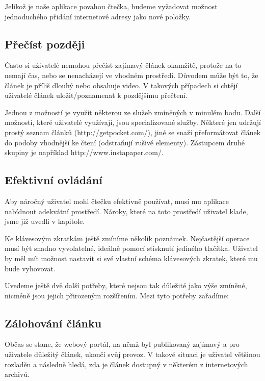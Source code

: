 Jelikož je naše aplikace povahou čtečka, budeme vyžadovat možnost jednoduchého přidání internetové adresy jako nové položky.

\subsection{Přečíst později}

Často si uživatelé nemohou přečíst zajímavý článek okamžitě, protože na to nemají čas, nebo se nenacházejí ve vhodném prostředí.
Důvodem může být to, že článek je příliš dlouhý nebo obsahuje video.
V takových případech si chtějí uživatelé článek uložit/poznamenat k pozdějšímu přečtení.

Jednou z možností je využít některou ze služeb zmíněných v minulém bodu.
Další možností, které uživatelé využívají, jsou specializované služby.
Některé jen udržují prostý seznam článků (http://getpocket.com/), jiné se snaží přeformátovat článek do podoby vhodnější ke čtení (odstraňují rušivé elementy).
Zástupcem druhé skupiny je například http://www.instapaper.com/.

\subsection{Efektivní ovládání}

Aby náročný uživatel mohl čtečku efektivně používat, musí mu aplikace nabídnout adekvátní prostředí.
Nároky, které na toto prostředí uživatel klade, jsme již uvedli v kapitole. %

Ke klávesovým zkratkám ještě zmíníme několik poznámek.
Nejčastější operace musí být snadno vyvolatelné, ideálně pomocí stisknutí jediného tlačítka.
Uživatel by měl mít možnost nastavit si své vlastní schéma klávesových zkratek, které mu bude vyhovovat.

\bigskip

Uvedeme ještě dvě další potřeby, které nejsou tak důležité jako výše zmíněné, nicméně jsou jejich přirozeným rozšířením.
Mezi tyto potřeby zařadíme:

\subsection{Zálohování článku}

Občas se stane, že webový portál, na němž byl publikovaný zajímavý a pro uživatele důležitý článek, ukončí svůj provoz.
V takové situaci je uživatel většinou rozladěn a následně hledá, zda je článek dostupný v některém z internetových archivů.

